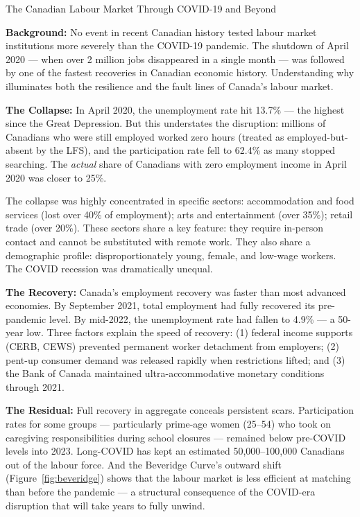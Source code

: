 \begin{casestudy}{The Canadian Labour Market Through COVID-19 and Beyond}

\textbf{Background:} No event in recent Canadian history tested labour
market institutions more severely than the COVID-19 pandemic. The shutdown
of April 2020 --- when over 2 million jobs disappeared in a single month ---
was followed by one of the fastest recoveries in Canadian economic history.
Understanding why illuminates both the resilience and the fault lines
of Canada's labour market.

\textbf{The Collapse:} In April 2020, the unemployment rate hit 13.7\% ---
the highest since the Great Depression. But this understates the disruption:
millions of Canadians who were still employed worked zero hours (treated
as employed-but-absent by the LFS), and the participation rate fell to
62.4\% as many stopped searching. The \textit{actual} share of Canadians
with zero employment income in April 2020 was closer to 25\%.

The collapse was highly concentrated in specific sectors: accommodation
and food services (lost over 40\% of employment); arts and entertainment
(over 35\%); retail trade (over 20\%). These sectors share a key feature:
they require in-person contact and cannot be substituted with remote work.
They also share a demographic profile: disproportionately young, female,
and low-wage workers. The COVID recession was dramatically unequal.

\textbf{The Recovery:} Canada's employment recovery was faster than most
advanced economies. By September 2021, total employment had fully recovered
its pre-pandemic level. By mid-2022, the unemployment rate had fallen to
4.9\% --- a 50-year low. Three factors explain the speed of recovery:
(1) federal income supports (CERB, CEWS) prevented permanent worker
detachment from employers; (2) pent-up consumer demand was released rapidly
when restrictions lifted; and (3) the Bank of Canada maintained
ultra-accommodative monetary conditions through 2021.

\textbf{The Residual:} Full recovery in aggregate conceals persistent
scars. Participation rates for some groups --- particularly prime-age
women (25--54) who took on caregiving responsibilities during school
closures --- remained below pre-COVID levels into 2023. Long-COVID
has kept an estimated 50{,}000--100{,}000 Canadians out of the
labour force. And the Beveridge Curve's outward shift (Figure~\ref{fig:beveridge})
shows that the labour market is less efficient at matching than before
the pandemic --- a structural consequence of the COVID-era disruption
that will take years to fully unwind.
\end{casestudy}


